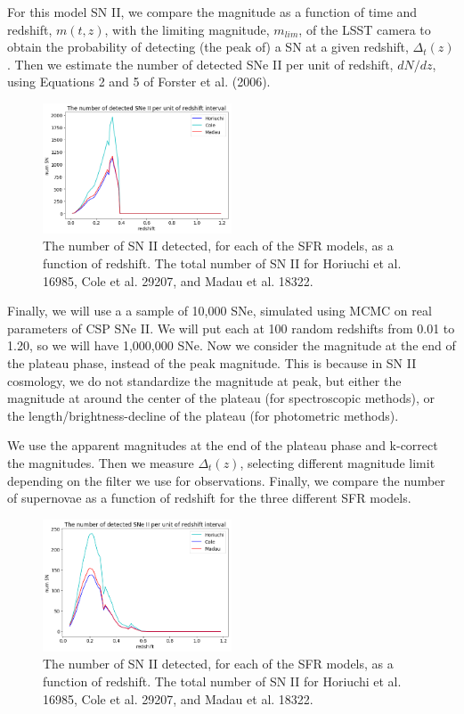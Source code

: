 \documentclass[12pt, onecolumn]{emulateapj}
\begin{document}
For this model SN II, we compare the magnitude as a function of time and redshift, $m(t,z)$, with the limiting magnitude, $m_{lim}$, of the LSST camera to obtain the probability of detecting (the peak of) a SN at a given redshift, $\Delta_{t}(z)$. Then we estimate the number of detected SNe II per unit of redshift, $dN/dz$, using Equations 2 and 5 of Forster et al. (2006).

\begin{figure}
	\begin{center}
		\includegraphics[width=0.5\textwidth]{number_SNII.png}
		\caption{The number of SN II detected, for each of the SFR models, as a function of redshift. The total number of SN II for Horiuchi et al. 16985, Cole et al. 29207, and Madau et al.  18322. }
		\label{fig:SNII_lc_wz}
	\end{center}
\end{figure}

Finally, we will use a a sample of 10,000 SNe, simulated using MCMC on real parameters of CSP SNe II. We will put each at 100 random redshifts from 0.01 to 1.20, so we will have 1,000,000 SNe. Now we consider the magnitude at the end of the plateau phase, instead of the peak magnitude. This is because in SN II cosmology, we do not standardize the magnitude at peak, but either the magnitude at around the center of the plateau (for spectroscopic methods), or the length/brightness-decline of the plateau (for photometric methods).

We use the apparent magnitudes at the end of the plateau phase and k-correct the magnitudes. Then we measure $\Delta_t(z)$, selecting different magnitude limit depending on the filter we use for observations. Finally, we compare the number of supernovae as a function of redshift for the three different SFR models.

\begin{figure}
	\begin{center}
		\includegraphics[width=0.5\textwidth]{number_SNII_withmagntiudescatter.png}
		\caption{The number of SN II detected, for each of the SFR models, as a function of redshift. The total number of SN II for Horiuchi et al. 16985, Cole et al. 29207, and Madau et al.  18322. }
		\label{fig:SNII_lc_wz}
	\end{center}
\end{figure}
\end{document}
